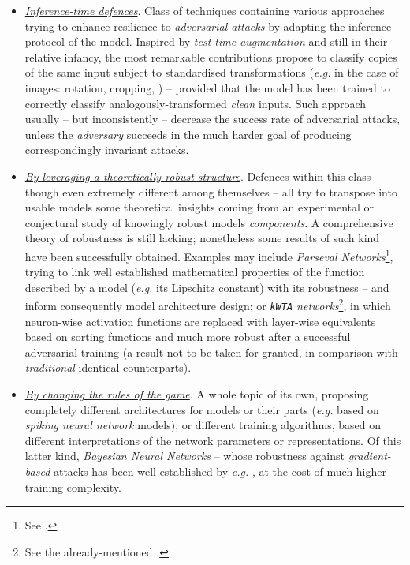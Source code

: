 \begin{itemize}
    \newline
    $\longrightarrow\ $The generator of \texttt{Defense-GAN}\footnote{Proposed in \cite{SamangoueiEtAl2018DefenseGAN}.}, instead, learns to generate tentative input reconstructions -- subject to difference-norm constraints \wrt the perturbed input -- while the discriminator learns to score the \textit{adversarial likelihood} of the result. Still being one of the best-performing defences in both \textit{white-box} and \textit{black-box} scenarios, such device carries the cost of extremely lengthy training times, and much \textit{longer than average} inference times too.
    \item \textit{\underline{Inference-time defences}}. Class of techniques containing various approaches trying to enhance resilience to \textit{adversarial attacks} by adapting the inference protocol of the model. Inspired by \textit{test-time augmentation} and still in their relative infancy, the most remarkable contributions propose to classify copies of the same input subject to standardised transformations (\textit{e.g.} in the case of images: rotation, cropping, \etc) -- provided that the model has been trained to correctly classify analogously-transformed \textit{clean} inputs. Such approach usually -- but inconsistently -- decrease the success rate of adversarial attacks, unless the \textit{adversary} succeeds in the much harder  goal of producing correspondingly invariant attacks.
    \item \textit{\underline{By leveraging a theoretically-robust structure}}. Defences within this class -- though even extremely different among themselves -- all try to transpose into usable models some theoretical insights coming from an experimental or conjectural study of knowingly robust models \textit{components}. A comprehensive theory of robustness is still lacking; nonetheless some results of such kind have been successfully obtained. Examples may include \textit{Parseval Networks}\footnote{See \cite{CisseEtAl2017Parseval}.}, trying to link well established mathematical properties of the function described by a model (\textit{e.g.} its Lipschitz constant) with its robustness -- and inform consequently model architecture design; or \textit{\texttt{kWTA} networks}\footnote{See the already-mentioned \cite{Xiao2020Enhancing}.}, in which neuron-wise activation functions are replaced with layer-wise equivalents based on sorting functions and much more robust after a successful adversarial training (a result not to be taken for granted, in comparison with \textit{traditional} identical counterparts).
    \item \textit{\underline{By changing the rules of the game}}. A whole topic of its own, proposing completely different architectures for models or their parts (\textit{e.g.} based on \textit{spiking neural network} models), or different training algorithms, based on different interpretations of the network parameters or representations. Of this latter kind, \textit{Bayesian Neural Networks} -- whose robustness against \textit{gradient-based} attacks has been well established by \textit{e.g.} \cite{CarboneEtAl2020Robustness}, at the cost of much higher training complexity.
\end{itemize}


